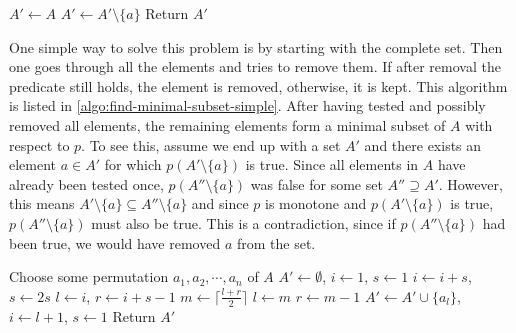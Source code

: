 \begin{algorithm}[ht]
  \begin{algorithmic}
    \State $A' \gets A$
        \State $A' \gets A' \setminus \{ a \}$
      \EndIf
    \EndFor
    \State Return $A'$
  \end{algorithmic}
  \caption{$\textsc{SimpleFindMinimalSubset}(A, p)$}
  \label{algo:find-minimal-subset-simple}
\end{algorithm}

One simple way to solve this problem is by starting with the complete set. Then one goes through all the elements and tries to remove them. If after removal the predicate still holds, the element is removed, otherwise, it is kept. This algorithm is listed in \cref{algo:find-minimal-subset-simple}. After having tested and possibly removed all elements, the remaining elements form a minimal subset of $A$ with respect to $p$. To see this, assume we end up with a set $A'$ and there exists an element $a \in A'$ for which $p(A' \setminus \{ a \})$ is true. Since all elements in $A$ have already been tested once, $p(A'' \setminus \{ a \})$ was false for some set $A'' \supseteq A'$. However, this means $A' \setminus \{ a \} \subseteq A'' \setminus \{ a \}$ and since $p$ is monotone and $p(A' \setminus \{ a \})$ is true, $p(A'' \setminus \{ a \})$ must also be true. This is a contradiction, since if $p(A'' \setminus \{ a \})$ had been true, we would have removed $a$ from the set.

\begin{algorithm}[ht]
  \begin{algorithmic}
    \State Choose some permutation $a_1, a_2, \cdots, a_n$ of $A$
    \State $A' \gets \emptyset$, \enspace $i \gets 1$, \enspace $s \gets 1$
        \State $i \gets i + s$, \enspace $s \gets 2 s$
      \Else
        \State $l \gets i$, \enspace $r \gets i + s - 1$
          \State $m \gets \lceil \frac{l + r}{2} \rceil$
            \State $l \gets m$
          \Else
            \State $r \gets m - 1$
          \EndIf
        \EndWhile
        \State $A' \gets A' \cup \{ a_l \}$, \enspace $i \gets l + 1$, \enspace $s \gets 1$
      \EndIf
    \EndWhile
    \State Return $A'$
  \end{algorithmic}
  \caption{$\textsc{FindMinimalSubset}(A, p)$}
  \label{algo:find-minimal-subset}
\end{algorithm}

